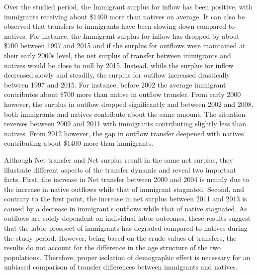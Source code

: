 \vspace{0.7em}\par
Over the studied period, the Immigrant surplus for inflow has been positive, with immigrants receiving about \$1400 more than natives on average.
It can also be observed that transfers to immigrants have been slowing down compared to natives.
For instance, the Immigrant surplus for inflow has dropped by about \$700 between 1997 and 2015 and if the surplus for outflows were maintained at their early 2000s level, the net surplus of transfer between immigrants and natives would be close to null by 2015.
Instead, while the surplus for inflow decreased slowly and steadily, the surplus for outflow increased drastically between 1997 and 2015.
For instance, before 2002 the average immigrant contributes about \$700 more than native in outflow transfer.
From early 2000 however, the surplus in outflow dropped significantly and between 2002 and 2008, both immigrants and natives contribute about the same amount.
The situation reverses between 2009 and 2011 with immigrants contributing slightly less than natives.
From 2012 however, the gap in outflow transfer deepened with natives contributing about \$1400 more than immigrants.

\vspace{0.7em}\par
Although Net transfer and Net surplus result in the same net surplus, they illustrate different aspects of the transfer dynamic and reveal two important facts.
First, the increase in Net transfer between 2000 and 2004 is mainly due to the increase in native outflows while that of immigrant stagnated.
Second, and contrary to the first point, the increase in net surplus between 2011 and 2013 is caused by a decrease in immigrant's outflows while that of native stagnated.
As outflows are solely dependent on individual labor outcomes, these results suggest that the labor prospect of immigrants has degraded compared to natives during the study period.
However, being based on the crude values of transfers, the results do not account for the difference in the age structure of the two populations.
Therefore, proper isolation of demographic effect is necessary for an unbiased comparison of transfer differences between immigrants and natives.















